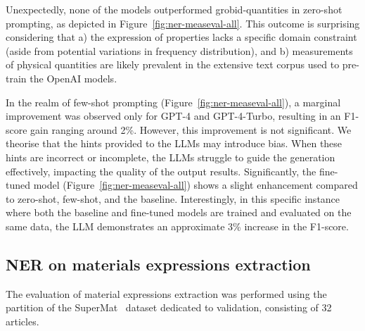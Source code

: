 
Unexpectedly, none of the models outperformed grobid-quantities in zero-shot prompting, as depicted in Figure~\ref{fig:ner-measeval-all}. This outcome is surprising considering that a) the expression of properties lacks a specific domain constraint (aside from potential variations in frequency distribution), and b) measurements of physical quantities are likely prevalent in the extensive text corpus used to pre-train the OpenAI models.

In the realm of few-shot prompting (Figure~\ref{fig:ner-measeval-all}), a marginal improvement was observed only for GPT-4 and GPT-4-Turbo, resulting in an F1-score gain ranging around 2\%. 
However, this improvement is not significant. 
We theorise that the hints provided to the LLMs may introduce bias. When these hints are incorrect or incomplete, the LLMs struggle to guide the generation effectively, impacting the quality of the output results.
Significantly, the fine-tuned model (Figure~\ref{fig:ner-measeval-all}) shows a slight enhancement compared to zero-shot, few-shot, and the baseline. Interestingly, in this specific instance where both the baseline and fine-tuned models are trained and evaluated on the same data, the LLM demonstrates an approximate 3\% increase in the F1-score.

\subsection{NER on materials expressions extraction}
\label{sec:results-ner-materials}
The evaluation of material expressions extraction was performed using the partition of the SuperMat~\cite{lfoppiano2021supermat} dataset dedicated to validation, consisting of 32 articles.


